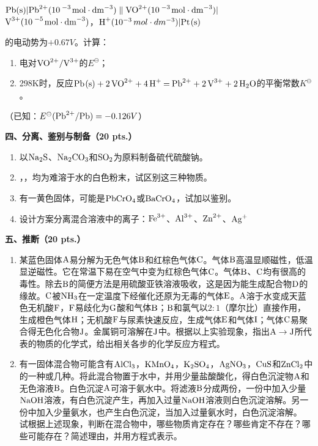 \begin{enumerate}[label=\arabic*., start=1, itemsep=1.5ex]
    $\ce{Pb(s)|Pb^{2+}(10^{-3}\,mol\cdot dm^{-3})\parallel VO^{2+}(10^{-3}\,mol\cdot dm^{-3})|}$\\
    $\ce{V^{3+}(10^{-5}\,mol\cdot dm^{-3})}$，$\ce{H^+}(10^{-3}\,mol\cdot dm^{-3})|\ce{Pt(s)}$
    
    的电动势为$+0.67V$。计算：
    \begin{enumerate}[label=(\arabic*), itemsep=1ex]
        \item 电对$\ce{VO^{2+}/V^{3+}}$的$E^\ominus$；
        \item 298K时，反应$\ce{Pb(s) + 2VO^{2+} + 4H^+ = Pb^{2+} + 2V^{3+} + 2H2O}$的平衡常数$K^\ominus$。
    \end{enumerate}
    （已知：$E^\ominus(\ce{Pb^{2+}/Pb})=-0.126V$）
\end{enumerate}

\vspace{0.5cm}
\noindent\textbf{四、分离、鉴别与制备（20 pts.）}

\begin{enumerate}[label=\arabic*., start=1, itemsep=1.5ex]
    \item 以$\ce{Na2S}$、$\ce{Na2CO3}$和$\ce{SO2}$为原料制备硫代硫酸钠。
    \item {}，，均为难溶于水的白色粉末，试区别这三种物质。
    \item 有一黄色固体，可能是$\ce{PbCrO4}$或$\ce{BaCrO4}$，试加以鉴别。
    \item 设计方案分离混合溶液中的离子：$\ce{Fe^{3+}}$、$\ce{Al^{3+}}$、$\ce{Zn^{2+}}$、$\ce{Ag^+}$
\end{enumerate}

\vspace{0.5cm}
\noindent\textbf{五、推断（20 pts.）}

\begin{enumerate}[label=\arabic*., start=1, itemsep=1.5ex]
    \item 某蓝色固体$\ce{A}$易分解为无色气体$\ce{B}$和红棕色气体$\ce{C}$。气体$\ce{B}$高温显顺磁性，低温显逆磁性。它在常温下易在空气中变为红棕色气体$\ce{C}$。气体$\ce{B}$、$\ce{C}$均有很高的毒性。除去$\ce{B}$的简便方法是用硫酸亚铁溶液吸收，这是因为能生成配合物$\ce{D}$的缘故。$\ce{C}$被$\ce{NH3}$在一定温度下经催化还原为无毒的气体$\ce{E}$。$\ce{A}$溶于水变成天蓝色无机酸$\ce{F}$，$\ce{F}$易歧化为$\ce{G}$酸和气体$\ce{B}$；$\ce{B}$和氯气以$2:1$（摩尔比）直接作用，生成橙色气体$\ce{H}$；无机酸$\ce{F}$与尿素快速反应，生成气体$\ce{E}$和气体$\ce{I}$；气体$\ce{C}$易聚合得无色化合物$\ce{J}$。金属铜可溶解在$\ce{J}$中。根据以上实验现象，指出$\ce{A\rightarrow J}$所代表的物质的化学式，给出相关各步的化学反应方程式。
    \item 有一固体混合物可能含有$\ce{AlCl3}$，$\ce{KMnO4}$，$\ce{K2SO4}$，$\ce{AgNO3}$，$\ce{CuS}$和$\ce{ZnCl2}$中的一种或几种。将此混合物置于水中，并用少量盐酸酸化，得白色沉淀物$\ce{A}$和无色溶液$\ce{B}$。白色沉淀$\ce{A}$可溶于氨水中。将滤液$\ce{B}$分成两份，一份中加入少量$\ce{NaOH}$溶液，有白色沉淀产生，再加入过量$\ce{NaOH}$溶液则白色沉淀溶解。另一份中加入少量氨水，也产生白色沉淀，当加入过量氨水时，白色沉淀溶解。
    试根据上述现象，判断在混合物中，哪些物质肯定存在？哪些肯定不存在？哪些可能存在？简述理由，并用方程式表示。
\end{enumerate}